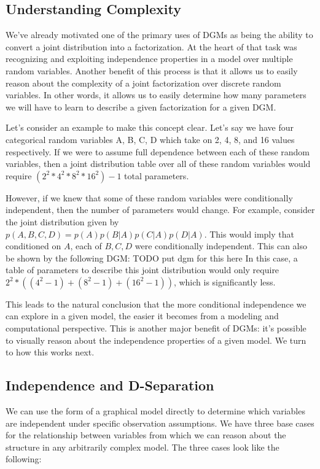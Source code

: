 \subsection{Understanding Complexity}
We've already motivated one of the primary uses of DGMs as being the ability to convert a joint distribution into a factorization. At the heart of that task was recognizing and exploiting independence properties in a model over multiple random variables. Another benefit of this process is that it allows us to easily reason about the complexity of a joint factorization over discrete random variables. In other words, it allows us to easily determine how many parameters we will have to learn to describe a given factorization for a given DGM.

Let's consider an example to make this concept clear. Let's say we have four categorical random variables A, B, C, D which take on 2, 4, 8, and 16 values respectively. If we were to assume full dependence between each of these random variables, then a joint distribution table over all of these random variables would require $(2^2 * 4^2 * 8^2 * 16^2) - 1$ total parameters.


However, if we knew that some of these random variables were conditionally independent, then the number of parameters would change. For example, consider the joint distribution given by $p(A, B, C, D) = p(A)p(B|A)p(C|A)p(D|A)$. This would imply that conditioned on $A$, each of $B, C, D$ were conditionally independent. This can also be shown by the following DGM:
TODO put dgm for this here
In this case, a table of parameters to describe this joint distribution would only require $2^2 * ((4^2 - 1) + (8^2 - 1) + (16^2 - 1))$, which is significantly less.

This leads to the natural conclusion that the more conditional independence we can explore in a given model, the easier it becomes from a modeling and computational perspective. This is another major benefit of DGMs: it's possible to visually reason about the independence properties of a given model. We turn to how this works next.

\subsection{Independence and D-Separation}
We can use the form of a graphical model directly to determine which variables are independent under specific observation assumptions. We have three base cases for the relationship between variables from which we can reason about the structure in any arbitrarily complex model. The three cases look like the following:


